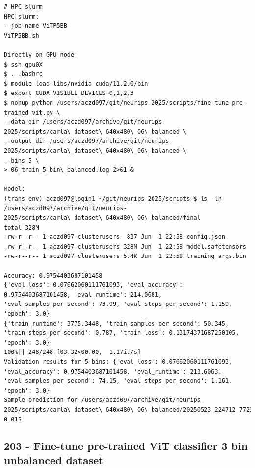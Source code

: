 \begin{verbatim}
# HPC slurm
HPC slurm:
--job-name ViTP5BB
ViTP5BB.sh

Directly on GPU node:
$ ssh gpu0X
$ . .bashrc
$ module load libs/nvidia-cuda/11.2.0/bin
$ export CUDA_VISIBLE_DEVICES=0,1,2,3
$ nohup python /users/aczd097/git/neurips-2025/scripts/fine-tune-pre-trained-vit.py \
--data_dir /users/aczd097/archive/git/neurips-2025/scripts/carla\_dataset\_640x480\_06\_balanced \
--output_dir /users/aczd097/archive/git/neurips-2025/scripts/carla\_dataset\_640x480\_06\_balanced \
--bins 5 \
> 06_train_5_bin\_balanced.log 2>&1 &

Model:
(trans-env) aczd097@login1 ~/git/neurips-2025/scripts $ ls -lh /users/aczd097/archive/git/neurips-2025/scripts/carla\_dataset\_640x480\_06\_balanced/final
total 328M
-rw-r--r-- 1 aczd097 clusterusers  837 Jun  1 22:58 config.json
-rw-r--r-- 1 aczd097 clusterusers 328M Jun  1 22:58 model.safetensors
-rw-r--r-- 1 aczd097 clusterusers 5.4K Jun  1 22:58 training_args.bin

Accuracy: 0.9754403687101458
{'eval_loss': 0.07662060111761093, 'eval_accuracy': 0.9754403687101458, 'eval_runtime': 214.0681, 'eval_samples_per_second': 73.99, 'eval_steps_per_second': 1.159, 'epoch': 3.0}
{'train_runtime': 3775.3448, 'train_samples_per_second': 50.345, 'train_steps_per_second': 0.787, 'train_loss': 0.13174371687250105, 'epoch': 3.0}
100%|| 248/248 [03:32<00:00,  1.17it/s]
Validation results for 5 bins: {'eval_loss': 0.07662060111761093, 'eval_accuracy': 0.9754403687101458, 'eval_runtime': 213.6063, 'eval_samples_per_second': 74.15, 'eval_steps_per_second': 1.161, 'epoch': 3.0}
Sample prediction for /users/aczd097/archive/git/neurips-2025/scripts/carla\_dataset\_640x480\_06\_balanced/20250523_224712_772284_steering_0.0150.jpg: 0.015

\end{verbatim}

\subsection{203 - Fine-tune pre-trained ViT classifier 3 bin unbalanced dataset}
\label{app_res:203}

